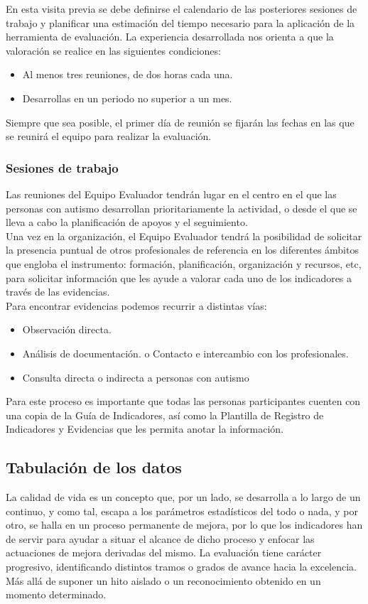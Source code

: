 En esta visita previa se debe definirse el calendario de las posteriores
sesiones de trabajo y planificar una estimación del tiempo necesario para la
aplicación de la herramienta de evaluación. La experiencia desarrollada nos
orienta a que la valoración se realice en las siguientes condiciones:
\begin{itemize}
	\item Al menos tres reuniones, de dos horas cada una.
	\item Desarrollas en un periodo no superior a un mes. 
\end{itemize} 
 
Siempre que sea posible, el primer día de reunión se fijarán las fechas en las
que se reunirá el equipo para realizar la evaluación.

\subsubsection{Sesiones de trabajo}
Las reuniones del Equipo Evaluador tendrán lugar en el centro en el que las
personas con autismo desarrollan prioritariamente la actividad, o desde el que
se lleva a cabo la planificación de apoyos y el seguimiento. 
\\
Una vez en la organización, el Equipo Evaluador tendrá la posibilidad de
solicitar la presencia puntual de otros profesionales de referencia en los
diferentes ámbitos que engloba el instrumento: formación, planificación,
organización y recursos, etc, para solicitar información que les ayude a valorar
cada uno de los indicadores a través de las evidencias.\\

Para encontrar evidencias podemos recurrir a distintas vías: 
\begin{itemize}
	\item Observación directa.
	\item Análisis de documentación. o Contacto e intercambio con los profesionales. 
	\item Consulta directa o indirecta a personas con autismo
\end{itemize}
Para este proceso es importante que todas las personas participantes cuenten con
una copia de la Guía de Indicadores, así como la Plantilla de
Registro de Indicadores y Evidencias que les permita anotar la
información.

\subsection{Tabulación de los datos}
La calidad de vida es un concepto que, por un lado, se desarrolla a lo largo de
un continuo, y como tal, escapa a los parámetros estadísticos del todo o nada, y
por otro, se halla en un proceso permanente de mejora, por lo que los
indicadores han de servir para ayudar a situar el alcance de dicho proceso y
enfocar las actuaciones de mejora derivadas del mismo. La evaluación tiene
carácter progresivo, identificando distintos tramos o grados de avance hacia la
excelencia. Más allá de suponer un hito aislado o un reconocimiento obtenido en
un momento determinado. 
 
